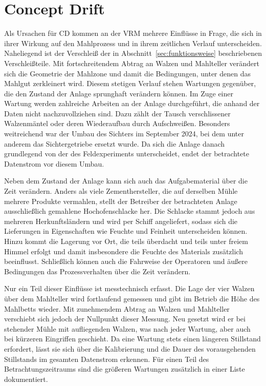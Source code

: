 \section{Concept Drift} \label{sec:mill_drift}
%
Als Ursachen für \ac{CD} kommen an der \ac{VRM} mehrere Einflüsse in Frage, die sich in ihrer Wirkung auf den Mahlprozess und in ihrem zeitlichen Verlauf unterscheiden. Naheliegend ist der Verschleiß der in Abschnitt~\ref{sec:funktionsweise} beschriebenen Verschleißteile. Mit fortschreitendem Abtrag an Walzen und Mahlteller verändert sich die Geometrie der Mahlzone und damit die Bedingungen, unter denen das Mahlgut zerkleinert wird. Diesem stetigen Verlauf stehen Wartungen gegenüber, die den Zustand der Anlage sprunghaft verändern können. Im Zuge einer Wartung werden zahlreiche Arbeiten an der Anlage durchgeführt, die anhand der Daten nicht nachzuvollziehen sind. Dazu zählt der Tausch verschlissener Walzenmäntel oder deren Wiederaufbau durch Aufschweißen. Besonders weitreichend war der Umbau des Sichters im September 2024, bei dem unter anderem das Sichtergetriebe ersetzt wurde. Da sich die Anlage danach grundlegend von der des Feldexperiments unterscheidet, endet der betrachtete Datenstrom vor diesem Umbau. \par
%
Neben dem Zustand der Anlage kann sich auch das Aufgabematerial über die Zeit verändern. Anders als viele Zementhersteller, die auf derselben Mühle mehrere Produkte vermahlen, stellt der Betreiber der betrachteten Anlage ausschließlich gemahlene Hochofenschlacke her. Die Schlacke stammt jedoch aus mehreren Herkunftsländern und wird per Schiff angeliefert, sodass sich die Lieferungen in Eigenschaften wie Feuchte und Feinheit unterscheiden können. Hinzu kommt die Lagerung vor Ort, die teils überdacht und teils unter freiem Himmel erfolgt und damit insbesondere die Feuchte des Materials zusätzlich beeinflusst. Schließlich können auch die Fahrweise der Operatoren und äußere Bedingungen das Prozessverhalten über die Zeit verändern. \par
%
Nur ein Teil dieser Einflüsse ist messtechnisch erfasst. Die Lage der vier Walzen über dem Mahlteller wird fortlaufend gemessen und gibt im Betrieb die Höhe des Mahlbetts wieder. Mit zunehmendem Abtrag an Walzen und Mahlteller verschiebt sich jedoch der Nullpunkt dieser Messung. Neu gesetzt wird er bei stehender Mühle mit aufliegenden Walzen, was nach jeder Wartung, aber auch bei kürzeren Eingriffen geschieht. Da eine Wartung stets einen längeren Stillstand erfordert, lässt sie sich über die Kalibrierung und die Dauer des vorausgehenden Stillstands im gesamten Datenstrom erkennen. Für einen Teil des Betrachtungszeitraums sind die größeren Wartungen zusätzlich in einer Liste dokumentiert. \par
